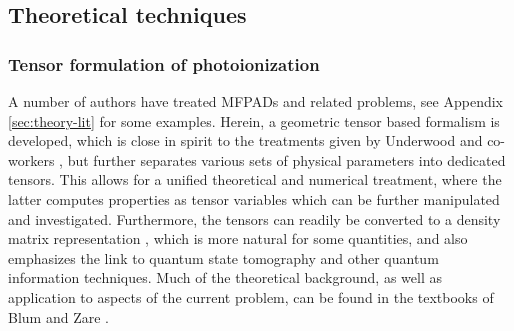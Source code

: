\documentclass[10pt]{article}
\begin{document}

\subsection{Theoretical techniques\label{sec:theoretical-techniques}}



\subsubsection{Tensor formulation of photoionization\label{sec:tensor-formulation}}

A number of authors have treated MFPADs and related problems, see Appendix \ref{sec:theory-lit} for some examples. Herein, a geometric tensor based formalism is developed, which is close in spirit to the treatments given by Underwood and co-workers \cite{Reid2000, Stolow2008, Underwood2000}, but further separates various sets of physical parameters into dedicated tensors. This allows for a unified theoretical and numerical treatment, where the latter computes properties as tensor variables which can be further manipulated and investigated. %
Furthermore, the tensors can readily be converted to a density matrix representation \cite{BlumDensityMat, zareAngMom}, which is more natural for some quantities, and also emphasizes the link to quantum state tomography and other quantum information techniques. Much of the theoretical background, as well as application to aspects of the current problem, can be found in the textbooks of Blum \cite{BlumDensityMat} and Zare \cite{zareAngMom}.
\end{document}
